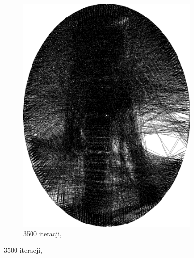 \documentclass[a4paper, 12pt, polish, twoside]{extreport}
\begin{document}
\begin{figure}[H]
\begin{subfigure}{0.19\textwidth}
            \includegraphics[width = \textwidth]{img/2-theory/aldrin/010mask-aldrin_ellipse_3500_threaded.png}
            \caption{3500 iteracji, }
            \label{przyklad-aldrin-j}
        \end{subfigure}
        

\end{figure}
\end{document}
